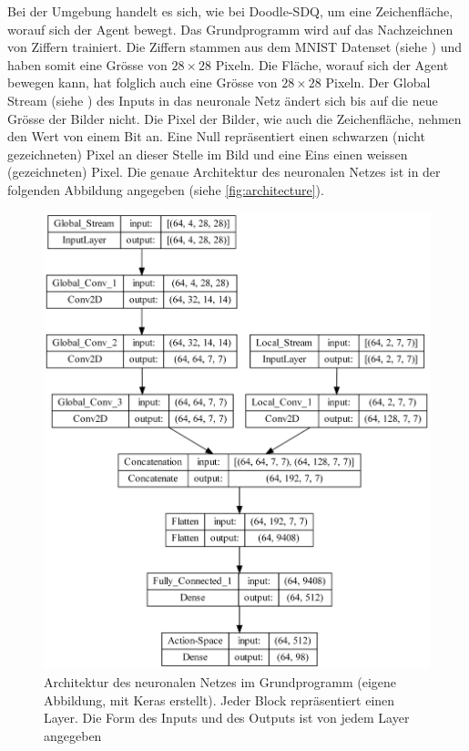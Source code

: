 Bei der Umgebung handelt es sich, wie bei Doodle-SDQ, um eine Zeichenfläche,
worauf sich der Agent bewegt. Das Grundprogramm wird auf das
Nachzeichnen von Ziffern trainiert. Die Ziffern stammen aus dem MNIST Datenset
(siehe ) und haben somit eine Grösse von $28\times28$
Pixeln. Die Fläche, worauf sich der Agent bewegen  
kann, hat folglich auch eine Grösse von $28\times28$ Pixeln. Der Global Stream
(siehe ) des Inputs in das neuronale Netz ändert sich
bis auf die neue Grösse der Bilder nicht. Die Pixel der Bilder, wie auch die
Zeichenfläche, nehmen den Wert von einem Bit an. Eine Null repräsentiert einen
schwarzen (nicht gezeichneten) Pixel an dieser Stelle im Bild und eine Eins
einen weissen (gezeichneten) Pixel. Die genaue Architektur des neuronalen Netzes
ist in der folgenden Abbildung angegeben (siehe \autoref{fig:architecture}). 
 
\begin{figure}[!ht]
 \centering
 \includegraphics[width=\textwidth-4cm]{images/methode/architecture.png}
 \caption{Architektur des neuronalen Netzes im Grundprogramm (eigene Abbildung, mit Keras erstellt). Jeder Block repräsentiert einen Layer. Die Form des Inputs und des Outputs ist von jedem Layer angegeben}\label{fig:architecture}
\end{figure}
 
